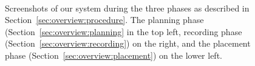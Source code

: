 \documentclass{vgtc}                          %
\begin{document}
\begin{figure}[t]
  \centering
  \begin{minipage}[b]{0.45\columnwidth}
  \\
  \vspace*{-0.02cm}
  \end{minipage}
  \caption{Screenshots of our system during the three phases as described in Section~\ref{sec:overview:procedure}. The planning phase (Section~\ref{sec:overview:planning} in the top left, recording phase (Section~\ref{sec:overview:recording}) on the right, and the placement phase (Section~\ref{sec:overview:placement}) on the lower left.}
  \label{fig:screenshot}
\end{figure}
\end{document}
